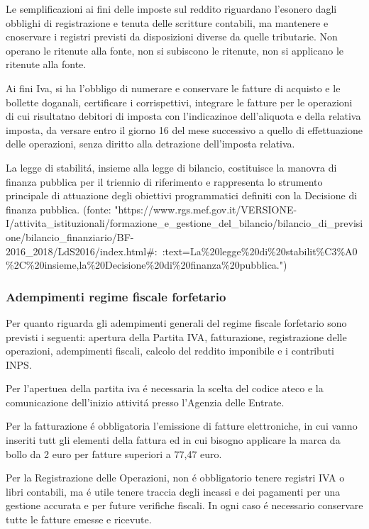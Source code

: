 \documentclass{article}
\begin{document}
Le semplificazioni ai fini delle imposte sul reddito riguardano l'esonero dagli obblighi di registrazione e tenuta delle scritture contabili, ma mantenere e cnoservare i registri previsti da disposizioni diverse da quelle tributarie.
Non operano le ritenute alla fonte, non si subiscono le ritenute, non si applicano le ritenute alla fonte. 

Ai fini Iva, si ha l'obbligo di numerare e conservare le fatture di acquisto e le bollette doganali, certificare i corrispettivi, 
integrare le fatture per le operazioni di cui risultatno debitori di imposta con l'indicazinoe dell'aliquota e della relativa imposta, da versare entro il giorno 16 del mese successivo a quello di effettuazione delle operazioni, senza diritto alla detrazione dell'imposta relativa.

La legge di stabilit\'a, insieme alla legge di bilancio, costituisce la manovra di finanza pubblica per il triennio di riferimento
e rappresenta lo strumento principale di attuazione degli obiettivi programmatici definiti con la Decisione di finanza pubblica. (fonte: "https://www.rgs.mef.gov.it/VERSIONE-I/attivita_istituzionali/formazione_e_gestione_del_bilancio/bilancio_di_previsione/bilancio_finanziario/BF-2016_2018/LdS2016/index.html#:~:text=La\%20legge\%20di\%20stabilit\%C3\%A0\%2C\%20insieme,la\%20Decisione\%20di\%20finanza\%20pubblica.")

\subsubsection{Adempimenti regime fiscale forfetario}
Per quanto riguarda gli adempimenti generali del regime fiscale forfetario sono previsti i seguenti: apertura della Partita IVA, fatturazione, registrazione delle operazioni, adempimenti fiscali, calcolo del reddito imponibile e i contributi INPS.

Per l'apertuea della partita iva \'e necessaria la scelta del codice ateco e la comunicazione dell'inizio attivit\'a presso l'Agenzia delle Entrate.

Per la fatturazione \'e obbligatoria l'emissione di fatture elettroniche, in cui vanno inseriti tutt gli elementi della fattura ed in cui bisogno applicare la marca da bollo da 2 euro per fatture superiori a 77,47 euro.

Per la Registrazione delle Operazioni, non \'e obbligatorio tenere registri IVA o libri contabili, ma \'e utile tenere traccia degli incassi e dei pagamenti per una gestione accurata e per future verifiche fiscali. 
In ogni caso \'e necessario conservare tutte le fatture emesse e ricevute.
\end{document}
